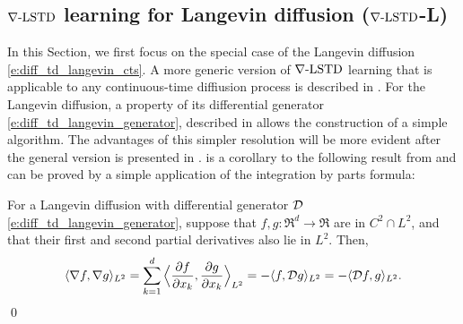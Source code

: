 \subsection{$\nabla\text{-LSTD}$ learning for Langevin diffusion ($\nabla\text{-LSTD}$-L)}
\label{s:diff_td_langevin}
In this Section, we first focus on the special case of the Langevin diffusion \eqref{e:diff_td_langevin_cts}. A more generic version of $\nabla\text{-LSTD}$ learning that is applicable to any continuous-time diffiusion process is described in . For the Langevin diffusion, a property of its differential generator \eqref{e:diff_td_langevin_generator},  described in  allows the construction of a simple algorithm. The advantages of this simpler resolution will be more evident after the general version is presented in .  is a corollary to the following result from \cite{hwanorwu15,yanlaumehmey16} and can be proved by a simple application of the integration by parts formula:
\begin{proposition}
	\label{prop:lang_generator_grad}
	For a Langevin diffusion with differential generator ${\cal D}$ \eqref{e:diff_td_langevin_generator}, suppose that $f,g\colon\Re^d \to\Re$ are in $C^2  \cap L^2$, and that their first and second partial derivatives also lie in $L^2$. Then,
	\begin{equation}
	\langle \nabla f, \nabla g \rangle_{L^2} = \sum_{k=1}^d \Big \langle \frac{\partial f}{\partial x_k},  \frac{\partial g} {\partial x_k}\Big \rangle_{L^2}  = - \langle  f, \generate g\rangle_{L^2} = - \langle \generate f , g \rangle_{L^2}.
	\label{e:diff_td_gradDual}
	\end{equation}
	\qed
\end{proposition} 
